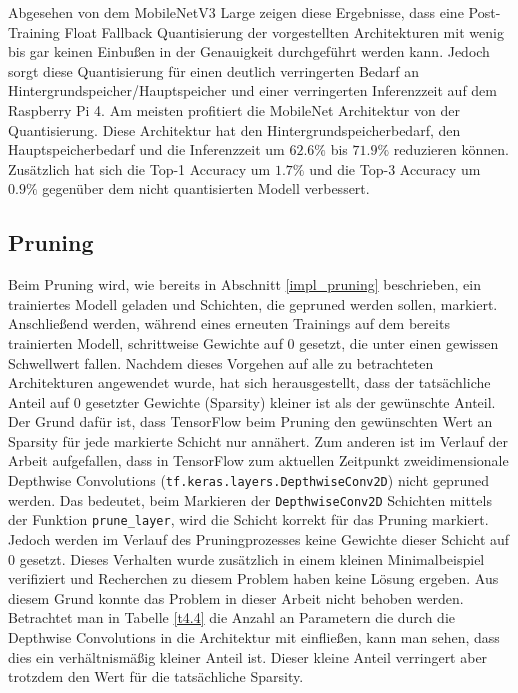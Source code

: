 Abgesehen von dem MobileNetV3 Large zeigen diese Ergebnisse, dass eine Post-Training Float Fallback Quantisierung der vorgestellten Architekturen mit wenig bis gar keinen Einbußen in der Genauigkeit durchgeführt werden kann. Jedoch sorgt diese Quantisierung für einen deutlich verringerten Bedarf an Hintergrundspeicher/Hauptspeicher und einer verringerten Inferenzzeit auf dem Raspberry Pi 4. Am meisten profitiert die MobileNet Architektur von der Quantisierung. Diese Architektur hat den Hintergrundspeicherbedarf, den Hauptspeicherbedarf und die Inferenzzeit um $62.6\%$ bis $71.9\%$ reduzieren können. Zusätzlich hat sich die Top-1 Accuracy um $1.7\%$ und die Top-3 Accuracy um $0.9\%$ gegenüber dem nicht quantisierten Modell verbessert.


\subsection{Pruning}
\label{eval_pruning}
Beim Pruning wird, wie bereits in Abschnitt \ref{impl_pruning} beschrieben, ein trainiertes Modell geladen und Schichten, die gepruned werden sollen, markiert. Anschließend werden, während eines erneuten Trainings auf dem bereits trainierten Modell, schrittweise Gewichte auf 0 gesetzt, die unter einen gewissen Schwellwert fallen. Nachdem dieses Vorgehen auf alle zu betrachteten Architekturen angewendet wurde, hat sich herausgestellt, dass der tatsächliche Anteil auf 0 gesetzter Gewichte (Sparsity) kleiner ist als der gewünschte Anteil. Der Grund dafür ist, dass TensorFlow beim Pruning den gewünschten Wert an Sparsity für jede markierte Schicht nur annähert. Zum anderen ist im Verlauf der Arbeit aufgefallen, dass in TensorFlow zum aktuellen Zeitpunkt zweidimensionale Depthwise Convolutions (\lstinline{tf.keras.layers.DepthwiseConv2D}) nicht gepruned werden. Das bedeutet, beim Markieren der \lstinline{DepthwiseConv2D} Schichten mittels der Funktion \lstinline{prune_layer}, wird die Schicht korrekt für das Pruning markiert. Jedoch werden im Verlauf des Pruningprozesses keine Gewichte dieser Schicht auf 0 gesetzt. Dieses Verhalten wurde zusätzlich in einem kleinen Minimalbeispiel verifiziert und Recherchen zu diesem Problem haben keine Lösung ergeben. Aus diesem Grund konnte das Problem in dieser Arbeit nicht behoben werden. Betrachtet man in Tabelle \ref{t4.4} die Anzahl an Parametern die durch die Depthwise Convolutions in die Architektur mit einfließen, kann man sehen, dass dies ein verhältnismäßig kleiner Anteil ist. Dieser kleine Anteil verringert aber trotzdem den Wert für die tatsächliche Sparsity.

